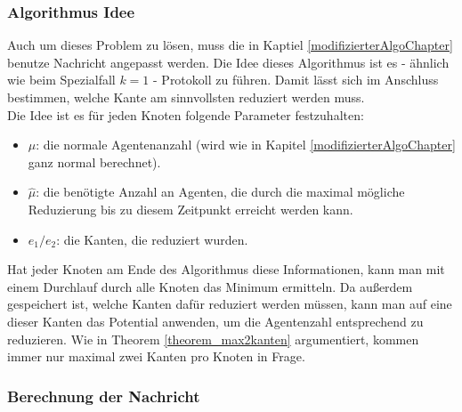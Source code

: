 \subsubsection{Algorithmus Idee}

	Auch um dieses Problem zu lösen, muss die in Kaptiel \ref{modifizierterAlgoChapter} benutze Nachricht angepasst werden. Die Idee dieses Algorithmus ist es - ähnlich wie beim Spezialfall $k = 1$ -  Protokoll zu führen. Damit lässt sich im Anschluss bestimmen, welche Kante am sinnvollsten reduziert werden muss.\\
	Die Idee ist es für jeden Knoten folgende Parameter festzuhalten: 
	\begin{itemize}
		\item $\mu$: die normale Agentenanzahl (wird wie in Kapitel \ref{modifizierterAlgoChapter} ganz normal berechnet).
		\item $\hat{\mu}$: die benötigte Anzahl an  Agenten, die durch die maximal mögliche Reduzierung bis zu diesem Zeitpunkt erreicht werden kann.
		\item $e_{1} / e_{2}$: die Kanten, die reduziert wurden.
	\end{itemize}
	Hat jeder Knoten am Ende des Algorithmus diese Informationen, kann man mit einem Durchlauf durch alle Knoten das Minimum ermitteln. Da außerdem gespeichert ist, welche Kanten dafür reduziert werden müssen, kann man auf eine dieser Kanten das Potential anwenden, um die Agentenzahl entsprechend zu reduzieren. Wie in Theorem \ref{theorem_max2kanten} argumentiert, kommen immer nur maximal zwei Kanten pro Knoten in Frage.
	
	\subsubsection{Berechnung der Nachricht}
	
